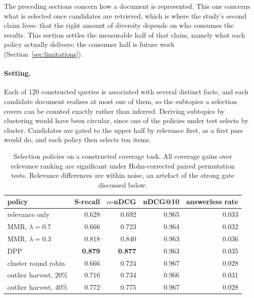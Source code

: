 The preceding sections concern how a document is represented. This one concerns
what is selected once candidates are retrieved, which is where the study's second
claim lives: that the right amount of diversity depends on who consumes the
results. This section settles the measurable half of that claim, namely what each
policy actually delivers; the consumer half is future work
(Section~\ref{sec:limitations}).

\paragraph{Setting.}
Each of 120 constructed queries is associated with several distinct facts, and
each candidate document realises at most one of them, so the subtopics a
selection covers can be counted exactly rather than inferred. Deriving subtopics
by clustering would have been circular, since one of the policies under test
selects by cluster. Candidates are gated to the upper half by relevance first, as
a first pass would do, and each policy then selects ten items.

\begin{table}[t]
\caption{Selection policies on a constructed coverage task. All coverage gains
over relevance ranking are significant under Holm-corrected paired permutation
tests. Relevance differences are within noise, an artefact of the strong gate
discussed below.}
\label{tab:diversity}
\centering
\begin{tabular}{lrrrr}
\toprule
policy & S-recall & $\alpha$-nDCG & nDCG@10 & answerless rate \\
\midrule
relevance only          & 0.628 & 0.692 & 0.965 & 0.033 \\
MMR, $\lambda=0.7$      & 0.666 & 0.723 & 0.964 & 0.032 \\
MMR, $\lambda=0.3$      & 0.818 & 0.840 & 0.963 & 0.036 \\
DPP                     & \textbf{0.879} & \textbf{0.877} & 0.963 & 0.035 \\
cluster round robin     & 0.666 & 0.724 & 0.967 & 0.028 \\
outlier harvest, 20\%   & 0.716 & 0.734 & 0.966 & 0.031 \\
outlier harvest, 40\%   & 0.772 & 0.775 & 0.967 & 0.028 \\
\bottomrule
\end{tabular}
\end{table}

